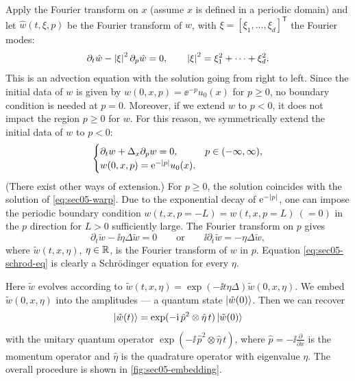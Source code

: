 Apply the Fourier transform on $x$ (assume $x$ is defined in a periodic domain)
and let $\hat{w}(t, \xi, p)$ be the Fourier transform of $w$, with
$\xi = [\xi_1, \dots, \xi_d]^{\mathsf{T}}$ the Fourier modes:
\begin{equation}
  \partial_t \hat{w} - \left\lvert \xi \right\rvert^2 \partial_p \hat{w} = 0,
  \qquad \left\lvert \xi \right\rvert^2 = \xi_1^2 + \cdots + \xi_d^2.
\end{equation}
This is an advection equation with the solution going from right to left. Since
the initial data of $w$ is given by $w(0, x, p) = \ee^{-p} u_0(x)$ for $p \ge 0$,
no boundary condition is needed at $p = 0$. Moreover, if we extend $w$ to $p < 0$,
it does not impact the region $p \ge 0$ for $w$. For this reason, we symmetrically
extend the initial data of $w$ to $p < 0$:
\begin{equation}
  \begin{cases}
    \partial_t w + \Delta_x \partial_p w = 0, & p \in (-\infty, \infty), \\
    w(0, x, p) = \mathrm{e}^{-\left\lvert p \right\rvert} u_0(x). &
  \end{cases}
  \label{eq:sec05-extended}
\end{equation}
(There exist other ways of extension.) For $p \ge 0$, the solution coincides with
the solution of \eqref{eq:sec05-warp}. Due to the exponential decay of
$\mathrm{e}^{-\left\lvert p \right\rvert}$, one can impose the periodic boundary condition
$w(t, x, p = -L) = w(t, x, p = L)\ (= 0)$ in the $p$ direction for $L > 0$
sufficiently large. The Fourier transform on $p$ gives
\begin{equation}
  \partial_t \tilde{w} - \ii\eta\Delta\tilde{w} = 0
  \qquad\text{or}\qquad \ii\partial_t \tilde{w} = -\eta\Delta\tilde{w},
  \label{eq:sec05-schrod-eq}
\end{equation}
where $\tilde{w}(t, x, \eta)$, $\eta \in \mathbb{R}$, is the Fourier transform of $w$ in
$p$. Equation \eqref{eq:sec05-schrod-eq} is clearly a Schr\"odinger equation for
every $\eta$.

Here $\tilde{w}$ evolves according to
$\tilde{w}(t, x, \eta) = \exp(-\ii t\eta\Delta)\tilde{w}(0, x, \eta)$. We embed
$\tilde{w}(0, x, \eta)$ into the amplitudes --- a quantum state
$\ket{\tilde{w}(0)}$. Then we can recover
\begin{equation}
  \ket{\tilde{w}(t)} = \exp(-\mathrm{i}\, \hat{p}^2 \otimes \hat{\eta}\, t)\ket{\tilde{w}(0)}
\end{equation}
with the unitary quantum operator $\exp(-\ii\, \hat{p}^2 \otimes \hat{\eta}\, t)$,
where $\hat{p} = -\ii\tfrac{\partial}{\partial x}$ is the momentum operator and
$\hat{\eta}$ is the quadrature operator with eigenvalue $\eta$. The overall
procedure is shown in \cref{fig:sec05-embedding}.

